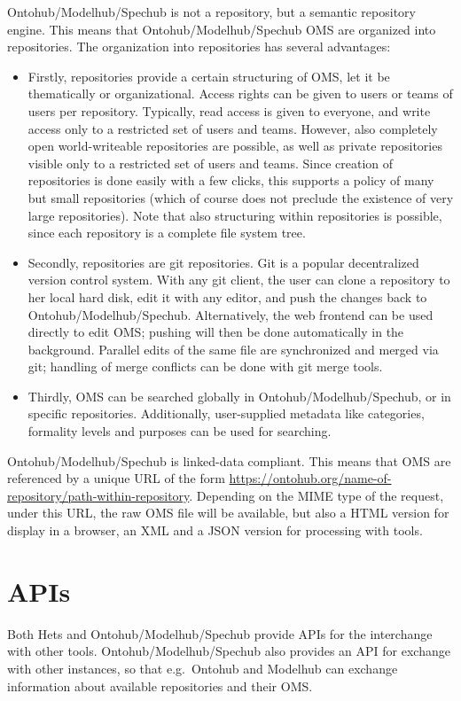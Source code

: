 \documentclass[10pt,fleqn,%
\ifpretendfinal
final%
\else
draft%
\fi,
]{scrreprt}
\newcommand{\sclause}[1]{\section{#1}}
\begin{document}
Ontohub/Modelhub/Spechub is not a repository, but a semantic repository engine. This
means that Ontohub/Modelhub/Spechub OMS are organized into repositories.
The
organization into repositories has several advantages:
\begin{itemize}
\item
 Firstly, repositories provide a certain structuring of OMS,
 let it be thematically or organizational. Access rights can be given
 to users or teams of users per repository. Typically, read access is
 given to everyone, and write access only to a restricted set of users
 and teams. However, also completely open world-writeable repositories
 are possible, as well as private repositories visible only to a
 restricted set of users and teams.  Since creation of repositories is
 done easily with a few clicks, this supports a policy of many but
 small repositories (which of course does not preclude the existence
 of very large repositories). Note that also structuring within
 repositories is possible, since each repository is a complete file
 system tree.
 
\item
 Secondly, repositories are git repositories. Git is a popular
 decentralized version control system. With any git client, the user
 can clone a repository to her local hard disk, edit it
 with any editor, and push the changes back to Ontohub/Modelhub/Spechub. Alternatively,
 the web frontend can be used directly to edit OMS; pushing
 will then be done automatically in the background. Parallel edits of
 the same file are synchronized and merged via git; handling of
 merge conflicts can be done with git merge tools.
\item
Thirdly, OMS can be searched globally in Ontohub/Modelhub/Spechub, or in
specific repositories. Additionally, user-supplied metadata like
categories, formality levels and purposes can be used for searching.
\end{itemize}

Ontohub/Modelhub/Spechub is linked-data compliant. This means that OMS are
referenced by a unique URL of the form
\url{https://ontohub.org/name-of-repository/path-within-repository}. Depending
on the MIME type of the request, under this URL, the raw OMS file
will be available, but also a HTML version for display in a browser, 
an XML and a JSON version for processing with tools.

\sclause{APIs}\label{c:APIs}

Both Hets and Ontohub/Modelhub/Spechub provide APIs for the interchange
with other tools. Ontohub/Modelhub/Spechub also provides an API for
exchange with other instances, so that e.g.\ Ontohub and Modelhub
can exchange information about available repositories and their OMS.
\end{document}
